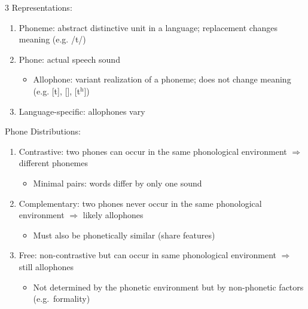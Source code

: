\documentclass[12pt, a4paper]{article}
\begin{document}
\begin{multicols*}{3}
Representations:
\begin{enumerate}[\roman*.]
  \item Phoneme: abstract distinctive unit in a language; replacement changes meaning
    (e.g. /t/)
  \item Phone: actual speech sound 
    \begin{itemize}[leftmargin=*]\vspace{3pt}
      \item Allophone: variant realization of a phoneme; does not change meaning
        (e.g. [t], [\textipa{\textfishhookr}], [t$^{\text{h}}$])
    \end{itemize}
  \item Language-specific: allophones vary
\end{enumerate}

Phone Distributions:
\begin{enumerate}[\roman*.]
  \item Contrastive: two phones can occur in the same phonological environment $\Rightarrow$ different phonemes
    \begin{itemize}[leftmargin=*]\vspace{3pt}
      \item Minimal pairs: words differ by only one sound
    \end{itemize}
  \item Complementary: two phones never occur in the same phonological environment $\Rightarrow$ likely allophones
    \begin{itemize}[leftmargin=*]\vspace{3pt}
      \item Must also be phonetically similar (share features)
    \end{itemize}
  \item Free: non-contrastive but can occur in same phonological environment $\Rightarrow$ still allophones 
    \begin{itemize}[leftmargin=*]\vspace{3pt}
      \item  Not determined by the phonetic environment but by non-phonetic factors (e.g.\ formality)
    \end{itemize}
\end{enumerate}


\end{multicols*}
\end{document}
